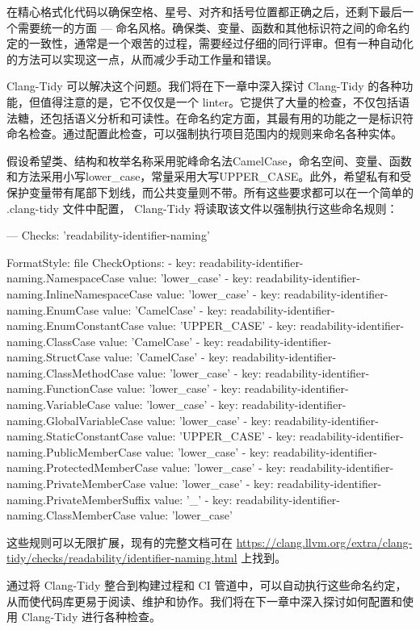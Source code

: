 在精心格式化代码以确保空格、星号、对齐和括号位置都正确之后，还剩下最后一个需要统一的方面 --- 命名风格。确保类、变量、函数和其他标识符之间的命名约定的一致性，通常是一个艰苦的过程，需要经过仔细的同行评审。但有一种自动化的方法可以实现这一点，从而减少手动工作量和错误。

Clang-Tidy 可以解决这个问题。我们将在下一章中深入探讨 Clang-Tidy 的各种功能，但值得注意的是，它不仅仅是一个 linter。它提供了大量的检查，不仅包括语法糖，还包括语义分析和可读性。在命名约定方面，其最有用的功能之一是标识符命名检查。通过配置此检查，可以强制执行项目范围内的规则来命名各种实体。

假设希望类、结构和枚举名称采用驼峰命名法CamelCase，命名空间、变量、函数和方法采用小写lower\_case，常量采用大写UPPER\_CASE。此外，希望私有和受保护变量带有尾部下划线，而公共变量则不带。所有这些要求都可以在一个简单的 .clang-tidy 文件中配置， Clang-Tidy 将读取该文件以强制执行这些命名规则：

\begin{shell}
---
Checks: 'readability-identifier-naming'

FormatStyle: file
CheckOptions:
    - key: readability-identifier-naming.NamespaceCase
      value: 'lower_case'
    - key: readability-identifier-naming.InlineNamespaceCase
      value: 'lower_case'
    - key: readability-identifier-naming.EnumCase
      value: 'CamelCase'
    - key: readability-identifier-naming.EnumConstantCase
      value: 'UPPER_CASE'
    - key: readability-identifier-naming.ClassCase
      value: 'CamelCase'
    - key: readability-identifier-naming.StructCase
      value: 'CamelCase'
    - key: readability-identifier-naming.ClassMethodCase
      value: 'lower_case'
    - key: readability-identifier-naming.FunctionCase
      value: 'lower_case'
    - key: readability-identifier-naming.VariableCase
      value: 'lower_case'
    - key: readability-identifier-naming.GlobalVariableCase
      value: 'lower_case'
    - key: readability-identifier-naming.StaticConstantCase
      value: 'UPPER_CASE'
    - key: readability-identifier-naming.PublicMemberCase
      value: 'lower_case'
    - key: readability-identifier-naming.ProtectedMemberCase
      value: 'lower_case'
    - key: readability-identifier-naming.PrivateMemberCase
      value: 'lower_case'
    - key: readability-identifier-naming.PrivateMemberSuffix
      value: '_'
    - key: readability-identifier-naming.ClassMemberCase
      value: 'lower_case'
\end{shell}

这些规则可以无限扩展，现有的完整文档可在 \url{https://clang.llvm.org/extra/clang-tidy/checks/readability/identifier-naming.html} 上找到。

通过将 Clang-Tidy 整合到构建过程和 CI 管道中，可以自动执行这些命名约定，从而使代码库更易于阅读、维护和协作。我们将在下一章中深入探讨如何配置和使用 Clang-Tidy 进行各种检查。








